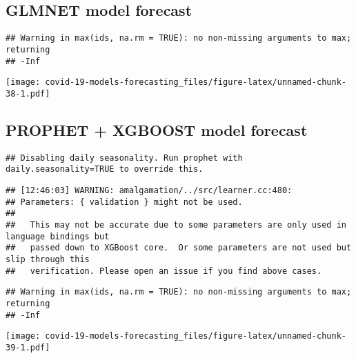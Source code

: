 \documentclass[
]{article}
\begin{document}
\hypertarget{glmnet-model-forecast-1}{%
\subsection{GLMNET model forecast}\label{glmnet-model-forecast-1}}

\begin{verbatim}
## Warning in max(ids, na.rm = TRUE): no non-missing arguments to max; returning
## -Inf
\end{verbatim}

\texttt{[image: covid-19-models-forecasting\_files/figure-latex/unnamed-chunk-38-1.pdf]}

\hypertarget{prophet-xgboost-model-forecast-1}{%
\subsection{PROPHET + XGBOOST model
forecast}\label{prophet-xgboost-model-forecast-1}}

\begin{verbatim}
## Disabling daily seasonality. Run prophet with daily.seasonality=TRUE to override this.
\end{verbatim}

\begin{verbatim}
## [12:46:03] WARNING: amalgamation/../src/learner.cc:480: 
## Parameters: { validation } might not be used.
## 
##   This may not be accurate due to some parameters are only used in language bindings but
##   passed down to XGBoost core.  Or some parameters are not used but slip through this
##   verification. Please open an issue if you find above cases.
\end{verbatim}

\begin{verbatim}
## Warning in max(ids, na.rm = TRUE): no non-missing arguments to max; returning
## -Inf
\end{verbatim}

\texttt{[image: covid-19-models-forecasting\_files/figure-latex/unnamed-chunk-39-1.pdf]}
\end{document}
